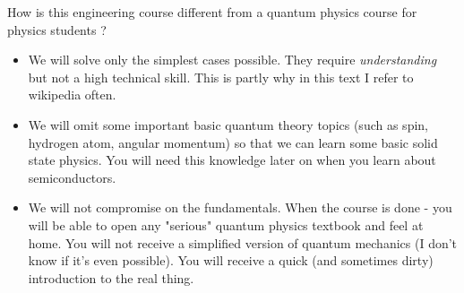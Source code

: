 \documentclass{Textbook}
\begin{document}
\noindent How is this engineering course different from a quantum physics course for physics students ?
\begin{itemize}
\item We will solve only the simplest cases possible. They require \emph{understanding} but not a high technical skill. This is partly why in this text I refer to wikipedia often.
\item We will omit some important basic quantum theory topics (such as spin, hydrogen atom, angular momentum) so that we can learn some basic solid state physics. You will need this knowledge later on when you learn about semiconductors.
\item We will not compromise on the fundamentals. When the course is done - you will be able to open any "serious" quantum physics textbook and feel at home. You will not receive a simplified version of quantum mechanics (I don't know if it's even possible). You will receive a quick (and sometimes dirty) introduction to the real thing.
\end{itemize}

\end{document}
